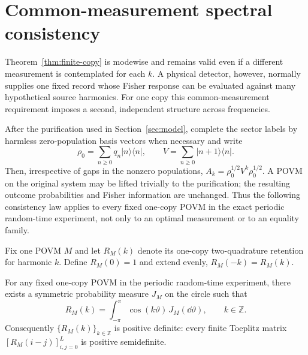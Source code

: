 \section{Common-measurement spectral consistency}
\label{sec:herglotz}

Theorem~\ref{thm:finite-copy} is modewise and remains valid even if a different measurement is contemplated for each $k$.  A physical detector, however, normally supplies one fixed record whose Fisher response can be evaluated against many hypothetical source harmonics.  For one copy this common-measurement requirement imposes a second, independent structure across frequencies.

After the purification used in Section~\ref{sec:model}, complete the sector labels by harmless zero-population basis vectors when necessary and write
\begin{equation}
 \rho_0=\sum_{n\geq0}q_n|n\rangle\langle n|,
 \qquad
 V=\sum_{n\geq0}|n+1\rangle\langle n|.
 \label{eq:full-shift-completion}
\end{equation}
Then, irrespective of gaps in the nonzero populations,
$A_k=\rho_0^{1/2}V^k\rho_0^{1/2}$.  A POVM on the original system may be lifted trivially to the purification; the resulting outcome probabilities and Fisher information are unchanged.  Thus the following consistency law applies to every fixed one-copy POVM in the exact periodic random-time experiment, not only to an optimal measurement or to an equality family.

Fix one POVM $M$ and let $R_M(k)$ denote its one-copy two-quadrature retention for harmonic $k$.  Define $R_M(0)=1$ and extend evenly, $R_M(-k)=R_M(k)$.

\begin{theorem}
\label{thm:herglotz}
For any fixed one-copy POVM in the periodic random-time experiment, there exists a symmetric probability measure $J_M$ on the circle such that
\begin{equation}
 R_M(k)=\int_{-\pi}^{\pi}\cos(k\vartheta)\,J_M(\dd\vartheta),
 \qquad k\in\mathbb Z.
 \label{eq:Herglotz-retention}
\end{equation}
Consequently $\{R_M(k)\}_{k\in\mathbb Z}$ is positive definite: every finite Toeplitz matrix $[R_M(i-j)]_{i,j=0}^{L}$ is positive semidefinite.
\end{theorem}


